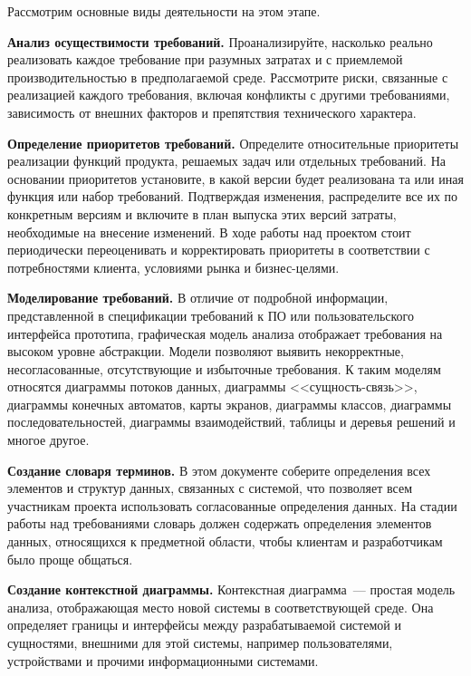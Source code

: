 \documentclass{../../text-style}
\begin{document}
Рассмотрим основные виды деятельности на этом этапе.

\textbf{Анализ осуществимости требований.} Проанализируйте, насколько реально реализовать каждое требование при разумных затратах и с приемлемой производительностью в предполагаемой среде. Рассмотрите риски, связанные с реализацией каждого требования, включая конфликты с другими требованиями, зависимость от внешних факторов и препятствия технического характера.

\textbf{Определение приоритетов требований.} Определите относительные приоритеты реализации функций продукта, решаемых задач или отдельных требований. На основании приоритетов установите, в какой версии будет реализована та или иная функция или набор требований. Подтверждая изменения, распределите все их по конкретным версиям и включите в план выпуска этих версий затраты, необходимые на внесение изменений. В ходе работы над проектом стоит периодически переоценивать и корректировать приоритеты в соответствии с потребностями клиента, условиями рынка и бизнес-целями.

\textbf{Моделирование требований.} В отличие от подробной информации, представленной в спецификации требований к ПО или пользовательского интерфейса прототипа, графическая модель анализа отображает требования на высоком уровне абстракции. Модели позволяют выявить некорректные, несогласованные, отсутствующие и избыточные требования. К таким моделям относятся диаграммы потоков данных, диаграммы <<сущность-связь>>, диаграммы конечных автоматов, карты экранов, диаграммы классов, диаграммы последовательностей, диаграммы взаимодействий, таблицы и деревья решений и многое другое.

\textbf{Создание словаря терминов.} В этом документе соберите определения всех элементов и структур данных, связанных с системой, что позволяет всем участникам проекта использовать согласованные определения данных. На стадии работы над требованиями словарь должен содержать определения элементов данных, относящихся к предметной области, чтобы клиентам и разработчикам было проще общаться.

\textbf{Создание контекстной диаграммы.} Контекстная диаграмма~--- простая модель анализа, отображающая место новой системы в соответствующей среде. Она определяет границы и интерфейсы между разрабатываемой системой и сущностями, внешними для этой системы, например пользователями, устройствами и прочими информационными системами.
\end{document}
